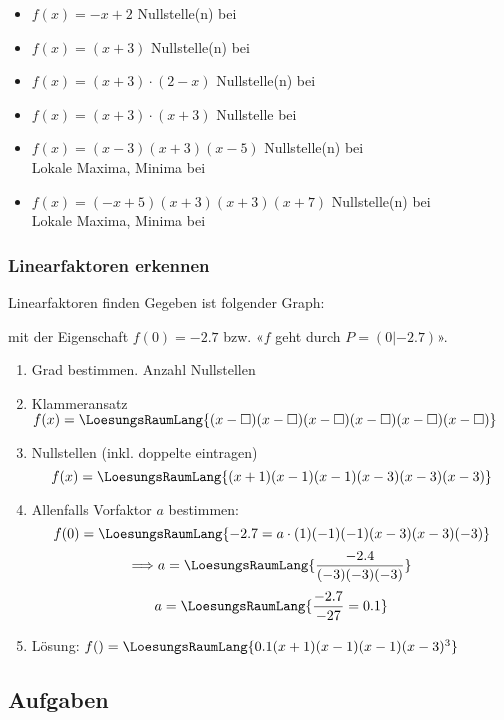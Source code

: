 \begin{itemize}
\item $f(x) = -x + 2 $ Nullstelle(n) bei  
\item $f(x) = (x+3)$ Nullstelle(n) bei 
\item $f(x) = (x+3)\cdot{}(2-x)$ Nullstelle(n) bei
\item $f(x) = (x+3)\cdot{}(x+3)$ 
  Nullstelle bei 
\item $f(x) = (x-3)(x+3)(x-5)$ Nullstelle(n) bei \\
  Lokale Maxima, Minima bei 
\item $f(x) = (-x+5)(x+3)(x+3)(x+7)$ Nullstelle(n) bei
  \\
  Lokale Maxima, Minima bei 
\end{itemize}
\newpage


\subsubsection{Linearfaktoren erkennen}

\begin{rezept}{Linearfaktoren finden}{}
Gegeben ist folgender Graph:

  mit der Eigenschaft $f(0) = -2.7$ bzw. «$f$ geht durch $P=(0|-2.7)$».
    
    \begin{enumerate}
  \item Grad bestimmen. Anzahl Nullstellen  
  \item Klammeransatz $f(x) =
    \LoesungsRaumLang{(x-\Box)(x-\Box)(x-\Box)(x-\Box)(x-\Box)(x-\Box)}$
  \item Nullstellen (inkl. doppelte eintragen)
    $$f(x) = \LoesungsRaumLang{(x+1)(x-1)(x-1)(x-3)(x-3)(x-3)}$$
  \item Allenfalls Vorfaktor $a$ bestimmen:
    $$f(0) = \LoesungsRaumLang{-2.7 = a \cdot{}(1)(-1)(-1)(x-3)(x-3)(-3)}$$
    $$\Longrightarrow a= \LoesungsRaumLang{\frac{-2.4}{(-3)(-3)(-3)}}$$
    $$a  = \LoesungsRaumLang{\frac{-2.7}{-27} = 0.1}$$

  \item Lösung: $f() = \LoesungsRaumLang{0.1 (x+1)(x-1)(x-1)(x-3)^3}$ 
    \end{enumerate}
  
  \end{rezept}
\newpage


\subsection*{Aufgaben}


\newpage

